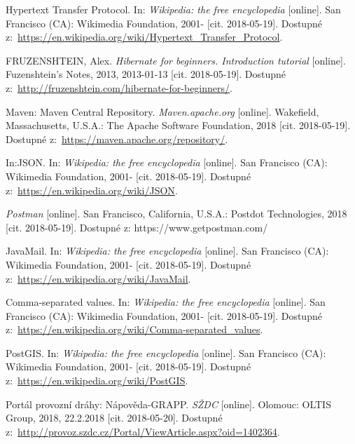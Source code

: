 \documentclass[a4paper,12pt]{article}
\begin{document}
{  Hypertext Transfer Protocol. In: \textit{Wikipedia: the free encyclopedia} [online]. San Francisco (CA): Wikimedia Foundation, 2001- [cit. 2018-05-19]. Dostupné z:~\url{https://en.wikipedia.org/wiki/Hypertext_Transfer_Protocol}.
  
  FRUZENSHTEIN, Alex. \textit{Hibernate for beginners. Introduction tutorial} [online]. Fuzenshtein's Notes, 2013, 2013-01-13 [cit. 2018-05-19]. Dostupné z:~\url{http://fruzenshtein.com/hibernate-for-beginners/}.
  
  Maven: Maven Central Repository. \textit{Maven.apache.org} [online]. Wakefield, Massachusetts, U.S.A.: The Apache Software Foundation, 2018 [cit. 2018-05-19]. Dostupné z:~\url{https://maven.apache.org/repository/}.
  
  In:JSON. In: \textit{Wikipedia: the free encyclopedia} [online]. San Francisco (CA): Wikimedia Foundation, 2001- [cit. 2018-05-19]. Dostupné z:~\url{https://en.wikipedia.org/wiki/JSON}.
  
  \textit{Postman} [online]. San Francisco, California, U.S.A.: Postdot Technologies, 2018 [cit. 2018-05-19]. Dostupné z: https://www.getpostman.com/
  
  JavaMail. In: \textit{Wikipedia: the free encyclopedia} [online]. San Francisco (CA): Wikimedia Foundation, 2001- [cit. 2018-05-19]. Dostupné z:~\url{https://en.wikipedia.org/wiki/JavaMail}.
  
  Comma-separated values. In: \textit{Wikipedia: the free encyclopedia} [online]. San Francisco (CA): Wikimedia Foundation, 2001- [cit. 2018-05-19]. Dostupné z:~\url{https://en.wikipedia.org/wiki/Comma-separated_values}.
  
  PostGIS. In: \textit{Wikipedia: the free encyclopedia} [online]. San Francisco (CA): Wikimedia Foundation, 2001- [cit. 2018-05-19]. Dostupné z:~\url{https://en.wikipedia.org/wiki/PostGIS}.
  
  Portál provozní dráhy: Nápověda-GRAPP. \textit{SŽDC} [online]. Olomouc: OLTIS Group, 2018, 22.2.2018 [cit. 2018-05-20]. Dostupné z:~\url{http://provoz.szdc.cz/Portal/ViewArticle.aspx?oid=1402364}.
  
  
  
}

\end{document}
